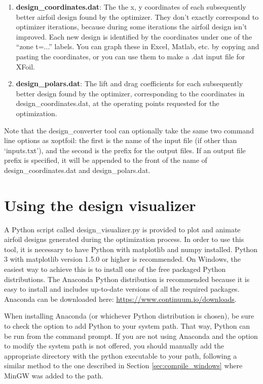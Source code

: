 \documentclass[11pt]{article}
\begin{document}
\begin{enumerate}
\item{\textbf{design\_coordinates.dat}: The the x, y
coordinates of each subsequently better airfoil design found by the optimizer. They don't
exactly correspond to optimizer iterations, because during some iterations the airfoil
design isn't improved. Each new design is identified by the coordinates under one of the
``zone t=...'' labels.  You can graph these in Excel, Matlab, etc. by copying and pasting
the coordinates, or you can use them to make a .dat input file for XFoil.}
\item{\textbf{design\_polars.dat}: The lift and drag coefficients for each subsequently 
better design found by the optimizer, corresponding to the coordinates in 
design\_coordinates.dat, at the operating points requested for the optimization.}
\end{enumerate}

Note that the design\_converter tool can optionally take the same two command line options
as xoptfoil: the first is the name of the input file (if other than `inputs.txt'), and the
second is the prefix for the output files.  If an output file prefix is specified, it will
be appended to the front of the name of design\_coordinates.dat and design\_polars.dat.

\section{Using the design visualizer}

A Python script called design\_visualizer.py is provided to plot and animate airfoil
designs generated during the optimization process.  In order to use this tool, it is
necessary to have Python with matplotlib and numpy installed.  Python 3 with matplotlib
version 1.5.0 or higher is recommended.  On Windows, the easiest
way to achieve this is to install one of the free packaged Python distributions.  The
Anaconda Python distribution is recommended because it is easy to install and includes
up-to-date versions of all the required packages.  Anaconda can be downloaded here:
\url{https://www.continuum.io/downloads}.

When installing Anaconda (or whichever Python distribution is chosen), be sure to check
the option to add Python to your system path.  That way, Python can be run from the
command prompt.  If you are not using Anaconda and the option to modify the system path is
not offered, you should manually add the appropriate directory with the python executable
to your path, following a similar method to the one described in Section
\ref{sec:compile_windows} where MinGW was added to the path.
\end{document}
